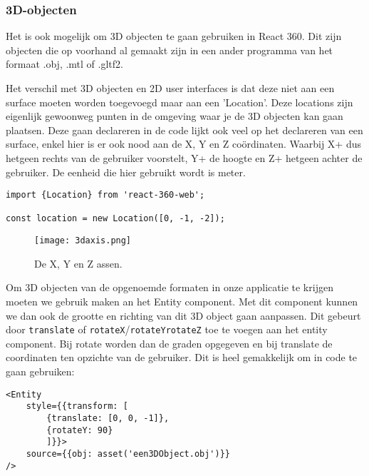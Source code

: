 \subsubsection{3D-objecten}
\label{ssubsec:3d-objecten}
Het is ook mogelijk om 3D objecten te gaan gebruiken in React 360. Dit zijn objecten die op voorhand al gemaakt zijn in een ander programma van het formaat .obj, .mtl of .gltf2.

Het verschil met 3D objecten en 2D user interfaces is dat deze niet aan een surface moeten worden toegevoegd maar aan een 'Location'. Deze locations zijn eigenlijk gewoonweg punten in de omgeving waar je de 3D objecten kan gaan plaatsen. Deze gaan declareren in de code lijkt ook  veel op het declareren van een surface, enkel hier is er ook nood aan de X, Y en Z coördinaten. Waarbij X+ dus hetgeen rechts van de gebruiker voorstelt, Y+ de hoogte en Z+ hetgeen achter de gebruiker. De eenheid die hier gebruikt wordt is meter.

\begin{lstlisting}[frame=single, caption=Voorbeeld van een surface]
import {Location} from 'react-360-web';

const location = new Location([0, -1, -2]);
\end{lstlisting}

\begin{figure}[H]
	\centering
	\texttt{[image: 3daxis.png]}
	\caption{De X, Y en Z assen.}
	\label{fig:xyz-axis}
\end{figure}

Om 3D objecten van de opgenoemde formaten in onze applicatie te krijgen moeten we gebruik maken an het Entity component. Met dit component kunnen we dan ook de grootte en richting van dit 3D object gaan aanpassen. Dit gebeurt door \lstinline[basicstyle=\ttfamily\color{red}]|translate| of \lstinline[basicstyle=\ttfamily\color{red}]|rotateX|/\lstinline[basicstyle=\ttfamily\color{red}]|rotateY|\lstinline[basicstyle=\ttfamily\color{red}]|rotateZ| toe te voegen aan het entity component. Bij rotate worden dan de graden opgegeven en bij translate de coordinaten ten opzichte van de gebruiker. Dit is heel gemakkelijk om in code te gaan gebruiken:

\begin{lstlisting}[frame=single, caption=Voorbeeld van een Entity component]
<Entity 
	style={{transform: [
		{translate: [0, 0, -1]},
		{rotateY: 90}
		]}}>
	source={{obj: asset('een3DObject.obj')}}
/>
\end{lstlisting}

